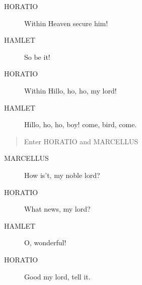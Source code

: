 \documentclass{article}
\begin{document}
\begin{description}
            
\item[HORATIO] 
               Within Heaven secure him!
\end{description}
          
\begin{description}
            
\item[HAMLET] So be it!
\end{description}
          
\begin{description}
            
\item[HORATIO] 
               Within  Hillo, ho, ho, my lord!
\end{description}
          
\begin{description}
            
\item[HAMLET] Hillo, ho, ho, boy! come, bird, come.
\end{description}
          
\begin{quote}
Enter HORATIO and MARCELLUS
\end{quote}
          
\begin{description}
            
\item[MARCELLUS] How is't, my noble lord?
\end{description}
          
\begin{description}
            
\item[HORATIO] What news, my lord?
\end{description}
          
\begin{description}
            
\item[HAMLET] O, wonderful!
\end{description}
          
\begin{description}
            
\item[HORATIO] Good my lord, tell it.
\end{description}
          
\end{document}
